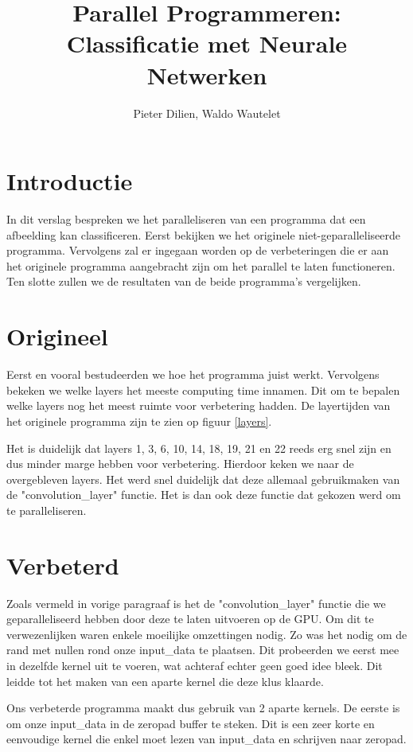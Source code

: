 \documentclass[a4paper, 12pt, one column]{article}
\title{\textbf{Parallel Programmeren: Classificatie met Neurale Netwerken}}
\author{Pieter Dilien, Waldo Wautelet}
\affil{Faculteit Industriele Ingenieurswetenschappen - Campus De Nayer, KU Leuven, Belgie}
\begin{document}
\maketitle

\section{Introductie}
In dit verslag bespreken we het paralleliseren van een programma dat een afbeelding kan classificeren.
Eerst bekijken we het originele niet-geparalleliseerde programma. Vervolgens zal er ingegaan worden op 
de verbeteringen die er aan het originele programma aangebracht zijn om het parallel te laten functioneren. Ten slotte
zullen we de resultaten van de beide programma's vergelijken.

\section{Origineel}
Eerst en vooral bestudeerden we hoe het programma juist werkt. Vervolgens bekeken we welke layers het meeste computing time 
innamen. Dit om te bepalen welke layers nog het meest ruimte voor verbetering hadden. De layertijden van het originele programma
zijn te zien op figuur \ref{layers}.

\medskip
\noindent
Het is duidelijk dat layers 1, 3, 6, 10, 14, 18, 19, 21 en 22 reeds erg snel zijn en dus minder marge hebben voor verbetering.
Hierdoor keken we naar de overgebleven layers. Het werd snel duidelijk dat deze allemaal gebruikmaken van de "convolution\_layer" functie.
Het is dan ook deze functie dat gekozen werd om te paralleliseren.

\section{Verbeterd}
Zoals vermeld in vorige paragraaf is het de "convolution\_layer" functie die we geparalleliseerd hebben door deze
te laten uitvoeren op de GPU. Om dit te verwezenlijken waren enkele moeilijke omzettingen nodig.
Zo was het nodig om de rand met nullen rond onze input\_data te plaatsen. Dit probeerden we eerst mee in dezelfde kernel 
uit te voeren, wat achteraf echter geen goed idee bleek. Dit leidde tot het maken van een aparte kernel die deze klus klaarde.

\medskip
\noindent
Ons verbeterde programma maakt dus gebruik van 2 aparte kernels. De eerste is om onze input\_data in de zeropad buffer te steken. 
Dit is een zeer korte en eenvoudige kernel die enkel moet lezen van input\_data en schrijven naar zeropad.
\end{document}
